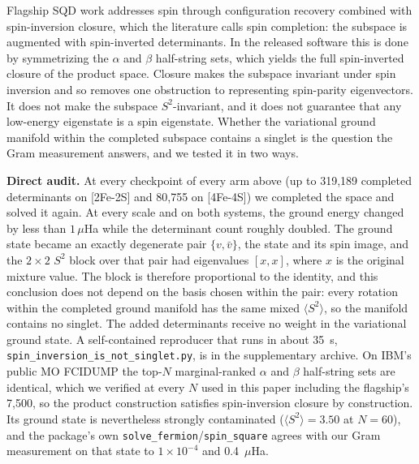\documentclass[11pt]{article}
\newcommand{\ssq}{\ensuremath{\langle S^2\rangle}}
\begin{document}
Flagship SQD work addresses spin through configuration recovery combined with spin-inversion closure, which the literature calls spin completion: the subspace is augmented with spin-inverted determinants. In the released software this is done by symmetrizing the $\alpha$ and $\beta$ half-string sets, which yields the full spin-inverted closure of the product space. Closure makes the subspace invariant under spin inversion and so removes one obstruction to representing spin-parity eigenvectors. It does not make the subspace $S^2$-invariant, and it does not guarantee that any low-energy eigenstate is a spin eigenstate. Whether the variational ground manifold within the completed subspace contains a singlet is the question the Gram measurement answers, and we tested it in two ways.

\textbf{Direct audit.} At every checkpoint of every arm above (up to 319{,}189 completed determinants on [2Fe-2S] and 80{,}755 on [4Fe-4S]) we completed the space and solved it again. At every scale and on both systems, the ground energy changed by less than $1\,\mu$Ha while the determinant count roughly doubled. The ground state became an exactly degenerate pair $\{v,\bar v\}$, the state and its spin image, and the $2\times2$ $S^2$ block over that pair had eigenvalues $[x,x]$, where $x$ is the original mixture value. The block is therefore proportional to the identity, and this conclusion does not depend on the basis chosen within the pair: every rotation within the completed ground manifold has the same mixed \ssq, so the manifold contains no singlet. The added determinants receive no weight in the variational ground state. A self-contained reproducer that runs in about 35~s, \texttt{spin\_inversion\_is\_not\_singlet.py}, is in the supplementary archive. On IBM's public MO FCIDUMP the top-$N$ marginal-ranked $\alpha$ and $\beta$ half-string sets are identical, which we verified at every $N$ used in this paper including the flagship's 7{,}500, so the product construction satisfies spin-inversion closure by construction. Its ground state is nevertheless strongly contaminated ($\langle S^2\rangle = 3.50$ at $N=60$), and the package's own \texttt{solve\_fermion}/\texttt{spin\_square} agrees with our Gram measurement on that state to $1\times10^{-4}$ and 0.4~$\mu$Ha.
\end{document}
